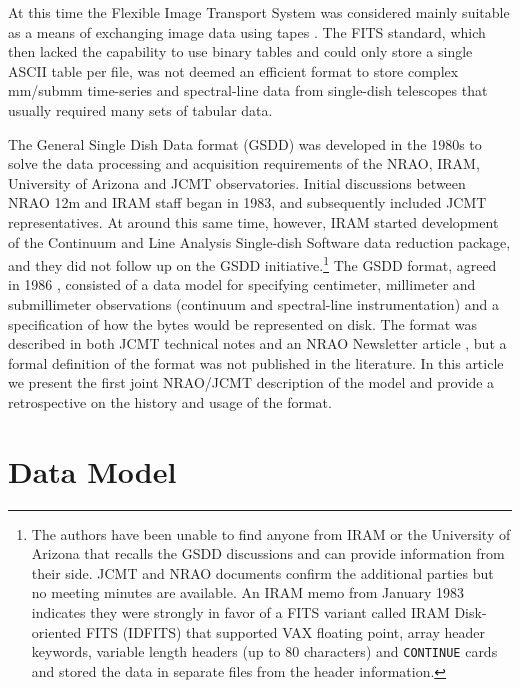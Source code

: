 \documentclass[final,authoryear,5p,times,twocolumn]{elsarticle}
\newcommand{\ascl}[1]{\href{http://www.ascl.net/#1}{ascl:#1}}
\begin{document}
At this time the Flexible Image Transport System
\citep[FITS;][]{1981A&AS...44..363W} was considered mainly
suitable as a means of exchanging image data using tapes
\citep{1980SPIE..264..298G}. The FITS standard, which then
lacked the capability to use binary tables and could only store a
single ASCII table per file, was not deemed an
efficient format to store complex mm/submm time-series and
spectral-line data from single-dish telescopes that usually required
many sets of tabular data.

The General Single Dish Data format (GSDD) was developed in the 1980s
to solve the data processing and acquisition requirements of the NRAO,
IRAM, University of Arizona and JCMT observatories.  Initial
discussions between NRAO 12m and IRAM staff began in 1983, and
subsequently included JCMT representatives. At around this same time,
however, IRAM started development of the Continuum and Line Analysis
Single-dish Software
\citep[][\ascl{1305.010}]{2005sf2a.conf..721P} data reduction package,
and they did not follow up on the GSDD initiative.\footnote{The
  authors have been unable to find anyone from IRAM or the University
  of Arizona that recalls the GSDD discussions and can provide
  information from their side. JCMT and NRAO documents confirm the
  additional parties but no meeting minutes are available. An IRAM
  memo from January 1983 indicates they were strongly in favor of a
  FITS variant called IRAM Disk-oriented FITS (IDFITS) that supported
  VAX floating point, array header keywords, variable length headers
  (up to 80 characters) and \texttt{CONTINUE} cards and stored the
  data in separate files from the header information.}  The GSDD
format, agreed in 1986 \citep[see e.g.,][]{mtdn84,1987NRAO30},
consisted of a data model for specifying centimeter, millimeter and
submillimeter observations (continuum and spectral-line
instrumentation) and a specification of how the bytes would be
represented on disk.  The format was described in both JCMT technical
notes \citep{mtdn84,mtdn85,SUN229} and an NRAO Newsletter article
\citep{1987NRAO30}, but a formal definition of the format was not
published in the literature. In this article we present the first
joint NRAO/JCMT description of the model and provide a retrospective
on the history and usage of the format.

\section{Data Model}
\end{document}
